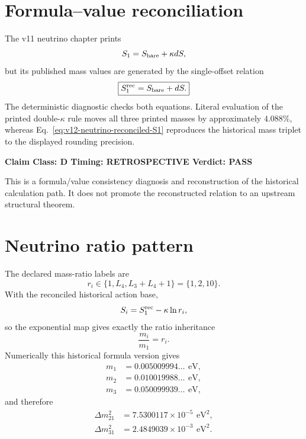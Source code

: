 \documentclass[11pt,a4paper,twoside]{book}
\theoremstyle{definition}
\newcommand{\vTwelveStatus}[3]{\par\noindent\textbf{Claim Class: #1 \quad Timing: #2 \quad Verdict: #3}\par}
\newcommand{\eV}{\,\text{eV}}
\begin{document}
\section{Formula--value reconciliation}
The v11 neutrino chapter prints
\[
S_1=S_{\rm bare}+\kappa dS,
\]
but its published mass values are generated by the single-offset relation
\begin{equation}
\boxed{
S_1^{\rm rec}=S_{\rm bare}+dS.
}
\label{eq:v12-neutrino-reconciled-S1}
\end{equation}
The deterministic diagnostic
checks both equations. Literal evaluation of the printed double-$\kappa$ rule
moves all three printed masses by approximately $4.088\%$, whereas
Eq.~\eqref{eq:v12-neutrino-reconciled-S1} reproduces the historical mass triplet
to the displayed rounding precision.

\vTwelveStatus{D}{RETROSPECTIVE}{PASS}
This is a formula/value consistency diagnosis and reconstruction of the
historical calculation path. It does not promote the reconstructed relation to
an upstream structural theorem.

\section{Neutrino ratio pattern}
The declared mass-ratio labels are
\begin{equation}
\boxed{
r_i\in\{1,L_4,L_3+L_4+1\}=\{1,2,10\}.
}
\label{eq:v12-neutrino-ratios}
\end{equation}
With the reconciled historical action base,
\begin{equation}
S_i=S_1^{\rm rec}-\kappa\ln r_i,
\label{eq:v12-neutrino-actions}
\end{equation}
so the exponential map gives exactly the ratio inheritance
\begin{equation}
\frac{m_i}{m_1}=r_i.
\label{eq:v12-neutrino-ratio-inheritance}
\end{equation}
Numerically this historical formula version gives
\begin{align}
m_1&=0.005009994\ldots\ \eV,\\
m_2&=0.010019988\ldots\ \eV,\\
m_3&=0.050099939\ldots\ \eV,
\end{align}
and therefore
\begin{align}
\Delta m_{21}^2
&=7.5300117\times10^{-5}\ \eV^2,\\
\Delta m_{31}^2
&=2.4849039\times10^{-3}\ \eV^2.
\end{align}
\end{document}
